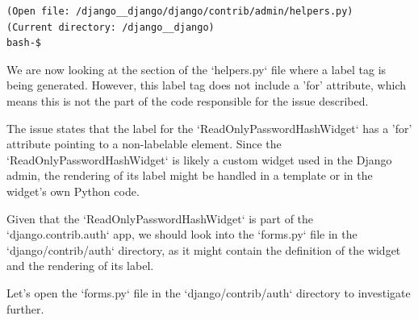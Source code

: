 {\begin{observationbox}
\begin{Verbatim}[breaklines=true, breakanywhere=true]
(Open file: /django__django/django/contrib/admin/helpers.py)
(Current directory: /django__django)
bash-$
\end{Verbatim}
\end{observationbox}
\begin{agentbox}
We are now looking at the section of the `helpers.py` file where a label tag is being generated. However, this label tag does not include a 'for' attribute, which means this is not the part of the code responsible for the issue described.



The issue states that the label for the `ReadOnlyPasswordHashWidget` has a 'for' attribute pointing to a non-labelable element. Since the `ReadOnlyPasswordHashWidget` is likely a custom widget used in the Django admin, the rendering of its label might be handled in a template or in the widget's own Python code.



Given that the `ReadOnlyPasswordHashWidget` is part of the `django.contrib.auth` app, we should look into the `forms.py` file in the `django/contrib/auth` directory, as it might contain the definition of the widget and the rendering of its label.



Let's open the `forms.py` file in the `django/contrib/auth` directory to investigate further.




\end{agentbox}}
